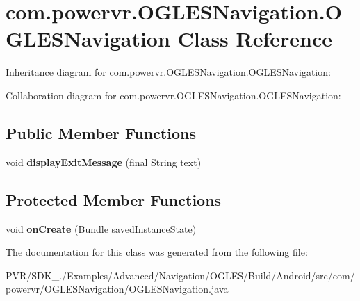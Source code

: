 \hypertarget{classcom_1_1powervr_1_1_o_g_l_e_s_navigation_1_1_o_g_l_e_s_navigation}{\section{com.\+powervr.\+O\+G\+L\+E\+S\+Navigation.\+O\+G\+L\+E\+S\+Navigation Class Reference}
\label{classcom_1_1powervr_1_1_o_g_l_e_s_navigation_1_1_o_g_l_e_s_navigation}
}


Inheritance diagram for com.\+powervr.\+O\+G\+L\+E\+S\+Navigation.\+O\+G\+L\+E\+S\+Navigation\+:


Collaboration diagram for com.\+powervr.\+O\+G\+L\+E\+S\+Navigation.\+O\+G\+L\+E\+S\+Navigation\+:
\subsection*{Public Member Functions}
\begin{DoxyCompactItemize}
\item 
\hypertarget{classcom_1_1powervr_1_1_o_g_l_e_s_navigation_1_1_o_g_l_e_s_navigation_ab67a42442f8b58690196bafa47856f47}{void {\bfseries display\+Exit\+Message} (final String text)}\label{classcom_1_1powervr_1_1_o_g_l_e_s_navigation_1_1_o_g_l_e_s_navigation_ab67a42442f8b58690196bafa47856f47}

\end{DoxyCompactItemize}
\subsection*{Protected Member Functions}
\begin{DoxyCompactItemize}
\item 
\hypertarget{classcom_1_1powervr_1_1_o_g_l_e_s_navigation_1_1_o_g_l_e_s_navigation_aea3f662fb04f9e3cd310937b30753d39}{void {\bfseries on\+Create} (Bundle saved\+Instance\+State)}\label{classcom_1_1powervr_1_1_o_g_l_e_s_navigation_1_1_o_g_l_e_s_navigation_aea3f662fb04f9e3cd310937b30753d39}

\end{DoxyCompactItemize}


The documentation for this class was generated from the following file\+:\begin{DoxyCompactItemize}
\item 
P\+V\+R/\+S\+D\+K\+\_./\+Examples/\+Advanced/\+Navigation/\+O\+G\+L\+E\+S/\+Build/\+Android/src/com/powervr/\+O\+G\+L\+E\+S\+Navigation/O\+G\+L\+E\+S\+Navigation.\+java\end{DoxyCompactItemize}

